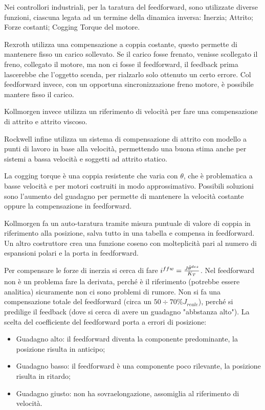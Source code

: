 Nei controllori industriali, per la taratura del feedforward, sono utilizzate diverse funzioni, ciascuna legata ad un termine della dinamica inversa: Inerzia; Attrito; Forze costanti; Cogging Torque del motore.

Rexroth utilizza una compensazione a coppia costante, questo permette di mantenere fisso un carico sollevato. Se il carico fosse frenato, venisse scollegato il freno, collegato il motore, ma non ci fosse il feedforward, il feedback prima lascerebbe che l'oggetto scenda, per rialzarlo solo ottenuto un certo errore. Col feedforward invece, con un opportuna sincronizzazione freno motore, è possibile mantere fisso il carico.

Kollmorgen invece utilizza un riferimento di velocità per fare una compensazione di attrito e attrito viscoso.

Rockwell infine utilizza un sistema di compensazione di attrito con modello a punti di lavoro in base alla velocità, permettendo una buona stima anche per sistemi a bassa velocità e soggetti ad attrito statico.

La cogging torque è una coppia resistente che varia con \(\theta\), che è problematica a basse velocità e per motori costruiti in modo approssimativo. Possibili soluzioni sono l'aumento del guadagno per permette di mantenere la velocità costante oppure la compensazione in feedforward.

Kollmorgen fa un auto-taratura tramite misura puntuale di valore di coppia in riferimento alla posizione, salva tutto in una tabella e compensa in feedforward.
Un altro costruttore crea una funzione coseno con molteplicità pari al numero di espansioni polari e la porta in feedforward.

Per compensare le forze di inerzia si cerca di fare \(i^{ffw}=\frac{J\Ddot{\theta}^{des}}{K_T}\). Nel feedforward non è un problema fare la derivata, perché è il riferimento (potrebbe essere analitica) sicuramente non ci sono problemi di rumore.
Non si fa una compensazione totale del feedforward (circa un \(50\div 70\% J_{reale}\)), perché si predilige il feedback (dove si cerca di avere un guadagno "abbstanza alto").
La scelta del coefficiente del feedforward porta a errori di posizione:
\begin{itemize}
    \item Guadagno alto: il feedforward diventa la componente predominante, la posizione risulta in anticipo;
    \item Guadagno basso: il feedforward è una componente poco rilevante, la posizione risulta in ritardo;
    \item Guadagno giusto: non ha sovraelongazione, assomiglia al riferimento di velocità.
\end{itemize}

